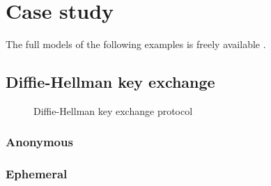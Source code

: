 
\section{Case study}
\label{section:case-study}

The full models of the following examples is freely available \cite{CaseStudies}.

\subsection{Diffie-Hellman key exchange}

\begin{figure}[t]
    \setmscoptions
    \begin{msc}{}
    
    

    \nextlevel[4]
    \nextlevel


    \nextlevel[6]
    \nextlevel

    \nextlevel

    \end{msc}
    \centering
    \caption{Diffie-Hellman key exchange protocol}
    \label{fig:dh-key-exchange}
\end{figure}

\subsubsection{Anonymous}

\subsubsection{Ephemeral}

